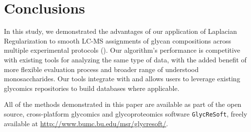\section{Conclusions}
    In this study, we demonstrated the advantages of our application of Laplacian
    Regularization to smooth LC-MS assignments of glycan compositions across multiple
    experimental protocols (\cite{Hu2012, Khatri2016a}). Our algorithm's performance is
    competitive with existing tools for analyzing the same type of data, with the added
    benefit of more flexible evaluation process and broader range of understood monosaccharides.
    Our tools integrate with \glyspace and allows users to leverage existing glycomics
    repositories to build databases where applicable.

    All of the methods demonstrated in this paper are available as part of the open source,
    cross-platform glycomics and glycoproteomics software \texttt{GlycReSoft}, freely
    available at \href{http://www.bumc.bu.edu/msr/glycresoft/}{http://www.bumc.bu.edu/msr/glycresoft/}.
